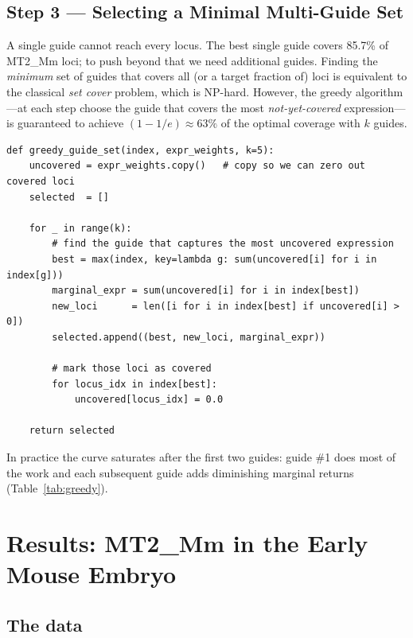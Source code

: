 \documentclass[11pt]{article}
\begin{document}
\subsection{Step 3 --- Selecting a Minimal Multi-Guide Set}

A single guide cannot reach every locus.  The best single guide covers 85.7\% of MT2\_Mm
loci; to push beyond that we need additional guides.  Finding the \emph{minimum} set of
guides that covers all (or a target fraction of) loci is equivalent to the classical
\emph{set cover} problem, which is NP-hard.  However, the greedy algorithm---at each step
choose the guide that covers the most \emph{not-yet-covered} expression---is guaranteed to
achieve $(1 - 1/e) \approx 63\%$ of the optimal coverage with $k$ guides.

\begin{lstlisting}[style=pycode,
  caption={Greedy $k$-guide selection.  At each round we pick the guide with the
    highest marginal gain over what is already covered, then zero out those loci so
    they are not double-counted.}]
def greedy_guide_set(index, expr_weights, k=5):
    uncovered = expr_weights.copy()   # copy so we can zero out covered loci
    selected  = []

    for _ in range(k):
        # find the guide that captures the most uncovered expression
        best = max(index, key=lambda g: sum(uncovered[i] for i in index[g]))
        marginal_expr = sum(uncovered[i] for i in index[best])
        new_loci      = len([i for i in index[best] if uncovered[i] > 0])
        selected.append((best, new_loci, marginal_expr))

        # mark those loci as covered
        for locus_idx in index[best]:
            uncovered[locus_idx] = 0.0

    return selected
\end{lstlisting}

In practice the curve saturates after the first two guides: guide \#1 does most of the work
and each subsequent guide adds diminishing marginal returns (Table~\ref{tab:greedy}).

\section{Results: MT2\_Mm in the Early Mouse Embryo}

\subsection{The data}
\end{document}
